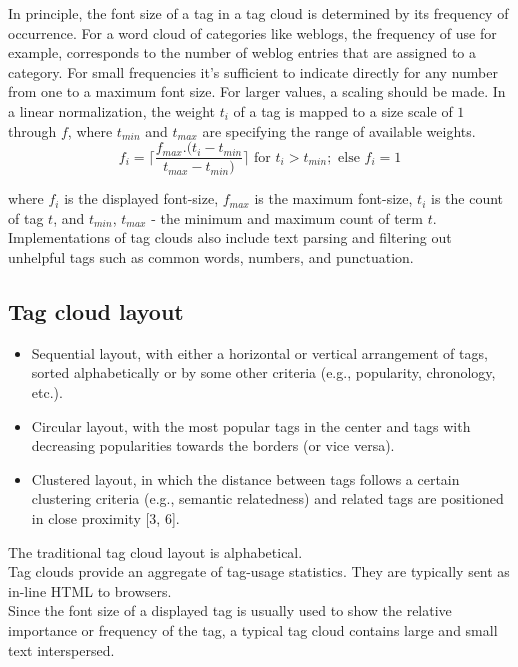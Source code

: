 In principle, the font size of a tag in a tag cloud is determined by its frequency of occurrence. For a word cloud of categories like weblogs, the frequency of use for example, corresponds to the number of weblog entries that are assigned to a category. For small frequencies it's sufficient to indicate directly for any number from one to a maximum font size. For larger values, a scaling should be made. In a linear normalization, the weight $t_{i}$ of a tag is mapped to a size scale of $1$ through $f$, where $t_{min}$ and $t_{max}$ are specifying the range of available weights. \\
\begin{equation}
f_{i} = \lceil {\frac{f_{max} . (t_{i} - t_{min}}{t_{max} - t_{min})} }\rceil \mbox{ for }  t_{i} > t_{min}; \mbox{ else }  f_{i} = 1
\end{equation}

where $f_{i}$ is the displayed font-size, $f_{max}$ is the maximum font-size, $t_{i}$ is the count of tag $t$, and $t_{min}$, $t_{max}$ - the minimum and maximum count of term $t$. \\

Implementations of tag clouds also include text parsing and filtering out unhelpful tags such as common words, numbers, and punctuation. \\

\subsection{Tag cloud layout}

\begin{itemize}
\item Sequential layout, with either a horizontal or vertical arrangement of tags, sorted
alphabetically or by some other criteria (e.g., popularity, chronology, etc.).

\item Circular layout, with the most popular tags in the center and tags with decreasing
popularities towards the borders (or vice versa).
 
\item Clustered layout, in which the distance between tags follows a certain clustering
criteria (e.g., semantic relatedness) and related tags are positioned in close
proximity [3, 6].
\end{itemize}

The traditional tag cloud layout is alphabetical. \\
Tag clouds provide an aggregate of tag-usage statistics. They are typically sent as in-line HTML to browsers. \\
Since the font size of a displayed tag is usually used to show the relative importance or frequency of the tag, a typical tag cloud contains large and small text interspersed. \\


